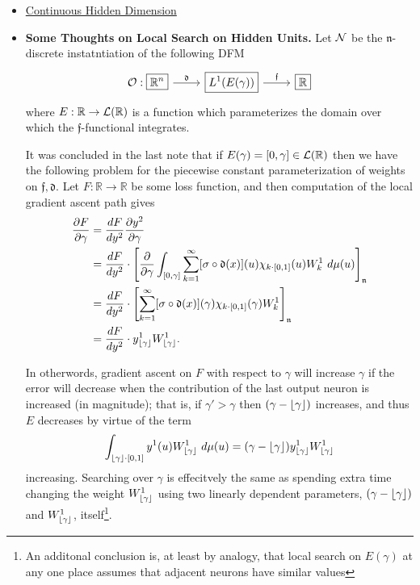 \documentclass[12pt]{article}
\begin{document}
\begin{itemize}
	\item \href{https://github.com/MadcowD/conthyperrep/blob/master/docs/notes/note1.pdf}{Continuous Hidden Dimension}
	\item \textbf{Some Thoughts on Local Search on Hidden Units.} Let $\scriptn$ be the $\mathfrak{n}$-discrete instatntiation of the following DFM
	\begin{equation*}
	\begin{tikzcd}
		\scripto: \boxed{\mathbb{R}^n} \arrow{r}{\mathfrak{d}} & \boxed{L^1(E(\gamma))} \arrow{r}{\mathfrak{f}} & \boxed{\mathbb{R}}
	\end{tikzcd}
	\end{equation*}
	where $E: \mathbb{R} \to \scriptl(\mathbb{R})$ is a function which parameterizes the domain over which the $\mathfrak{f}$-functional integrates.
	

	It was concluded in the last note that if $E(\gamma) = [0, \gamma] \in \scriptl(\mathbb{R})$ then we have the following problem for the piecewise constant
	parameterization of weights on $\mathfrak{f}, \mathfrak{d}.$ Let $F: \mathbb{R} \to \mathbb{R}$ be some loss function, and then computation of the local gradient ascent path
	gives
	\begin{equation*}
	\begin{aligned}
		\frac{\partial F}{\partial \gamma} &= \frac{d F}{d y^2} \frac{\partial y^2}{\partial \gamma} \\
		 &= \frac{d F}{d y^2} \cdot \left[\frac{\partial }{\partial \gamma}  \int_{[0, \gamma]} \sum_{k=1}^\infty  [\sigma \circ \mathfrak{d}(x)](u)  \chi_{k\cdot [0,1]}(u) W^1_{k}\ d\mu(u)   \right]_\mathfrak{n} \\
		 &= \frac{d F}{d y^2} \cdot \left[ \sum_{k=1}^\infty  [\sigma \circ \mathfrak{d}(x)](\gamma)  \chi_{k\cdot [0,1]}(\gamma) W^1_{k}    \right]_\mathfrak{n} \\
		 &= \frac{d F}{d y^2} \cdot  y^1_{\floor*{\gamma}} W^1_{\floor*{\gamma}}.
	\end{aligned}
	\end{equation*}

	In otherwords, gradient ascent on $F$ with respect to $\gamma$ will increase $\gamma$ if the error will decrease when the contribution of the last output neuron is increased (in magnitude); that is, if $\gamma' > \gamma$ then $(\gamma - \floor*{\gamma})$ increases, and thus $E$ decreases by virtue of the term 
	\begin{equation*}
		\int_{\floor*{\gamma}\cdot [0,1]} y^1(u) W^1_{\floor*{\gamma}}\ d\mu(u) = (\gamma - \floor*{\gamma}) y^1_{\floor*{\gamma}} W^1_{\floor*{\gamma}}
	\end{equation*} increasing. Searching over $\gamma$ is effecitvely the same as spending extra time changing the weight $W_{\floor*{\gamma}}^1$ using two linearly dependent parameters, $(\gamma - \floor*{\gamma})$ and $W_{\floor*{\gamma}}^1$, itself\footnote{An additonal conclusion is, at least by analogy, that local search on $E(\gamma)$ at any one place assumes that adjacent neurons have similar values }. 


\end{itemize}
\end{document}

